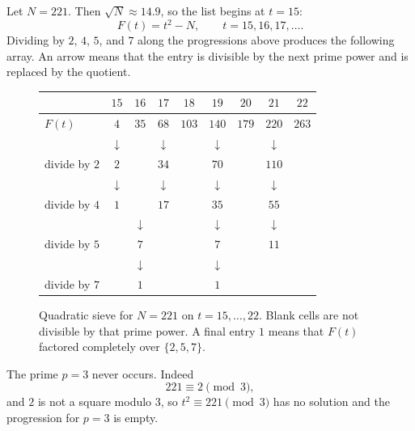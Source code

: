 \begin{example}[Sieving \(F(t)=t^{2}-221\)]
Let \(N=221\). Then \(\sqrt{N}\approx 14.9\), so the list begins at
\(t=15\):
\[
    F(t)=t^{2}-N,\qquad t=15,16,17,\ldots.
\]
Dividing by \(2\), \(4\), \(5\), and \(7\) along the progressions above
produces the following array. An arrow means that the entry is divisible
by the next prime power and is replaced by the quotient.

\begin{figure}[H]
\centering
\setlength{\tabcolsep}{5.5pt}
\renewcommand{\arraystretch}{1.18}
\begin{tabular}{l|cccccccc}
    & \(15\) & \(16\) & \(17\) & \(18\) & \(19\) & \(20\) & \(21\) & \(22\) \\
    \hline
    \(F(t)\)
        & \(4\) & \(35\) & \(68\) & \(103\) & \(140\) & \(179\) & \(220\) & \(263\) \\
        & \(\downarrow\) & & \(\downarrow\) & & \(\downarrow\) & & \(\downarrow\) & \\
    divide by \(2\)
        & \(2\) & & \(34\) & & \(70\) & & \(110\) & \\
        & \(\downarrow\) & & \(\downarrow\) & & \(\downarrow\) & & \(\downarrow\) & \\
    divide by \(4\)
        & \(1\) & & \(17\) & & \(35\) & & \(55\) & \\
        & & \(\downarrow\) & & & \(\downarrow\) & & \(\downarrow\) & \\
    divide by \(5\)
        & & \(7\) & & & \(7\) & & \(11\) & \\
        & & \(\downarrow\) & & & \(\downarrow\) & & & \\
    divide by \(7\)
        & & \(1\) & & & \(1\) & & & \\
\end{tabular}
\caption{Quadratic sieve for \(N=221\) on \(t=15,\ldots,22\). Blank cells
are not divisible by that prime power. A final entry \(1\) means that
\(F(t)\) factored completely over \(\{2,5,7\}\).}
\end{figure}

The prime \(p=3\) never occurs. Indeed
\[
    221\equiv 2\pmod{3},
\]
and \(2\) is not a square modulo \(3\), so \(t^{2}\equiv 221\pmod{3}\) has
no solution and the progression for \(p=3\) is empty.


\end{example}
